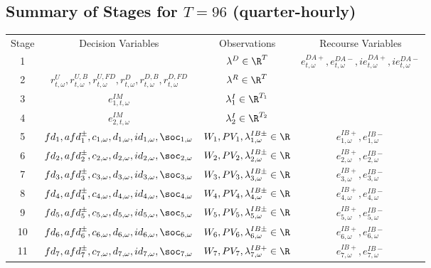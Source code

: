 \subsection{\texorpdfstring{Summary of Stages for $T = 96$ (quarter-hourly)}{Summary of Stages for T = 96 (quarter-hourly)}}

\begin{table}[H]
\begin{tabular}{c c c c}
	Stage & Decision Variables & Observations & Recourse Variables \\
	1 & & $\lambda^D \in \R^{T}$& $e^{DA+}_{t, \omega}, e^{DA-}_{t, \omega}, ie^{DA+}_{t, \omega}, ie^{DA-}_{t, \omega}$\\
	2 & $r^U_{t, \omega}, r^{U, B}_{t, \omega}, r^{U, FD}_{t, \omega}, r^{D}_{t, \omega}, r^{D, B}_{t, \omega}, r^{D, FD}_{t, \omega}$ & $\lambda^R \in \R^{T}$& \\
	3 & $e^{IM}_{1, t, \omega}$ & $\lambda^I_1 \in \R^{T_1}$&  \\
	4 & $e^{IM}_{2, t, \omega}$ & $\lambda^I_2 \in \R^{T_2}$&  \\
	5 & $fd_1, afd^{\pm}_1, c_{1, \omega}, d_{1, \omega}, id_{1, \omega}, \soc_{1, \omega}$ & $W_1, PV_1, \lambda^{IB\pm}_{1, \omega} \in \R$ & $e^{IB+}_{1, \omega}, e^{IB-}_{1, \omega}$\\
	6 & $fd_2, afd^{\pm}_2, c_{2, \omega}, d_{2, \omega}, id_{2, \omega}, \soc_{2, \omega}$ & $W_2, PV_2, \lambda^{IB\pm}_{2, \omega} \in \R$ & $e^{IB+}_{2, \omega}, e^{IB-}_{2, \omega}$\\
	7& $fd_3, afd^{\pm}_3, c_{3, \omega}, d_{3, \omega}, id_{3, \omega}, \soc_{3, \omega}$  & $W_3, PV_3, \lambda^{IB\pm}_{3, \omega} \in \R$ & $e^{IB+}_{3, \omega}, e^{IB-}_{3, \omega}$\\
	8& $fd_4, afd^{\pm}_4, c_{4, \omega}, d_{4, \omega}, id_{4, \omega}, \soc_{4, \omega}$ & $W_4, PV_4, \lambda^{IB\pm}_{4, \omega} \in \R$ & $e^{IB+}_{4, \omega}, e^{IB-}_{4, \omega}$\\
	9& $fd_5, afd^{\pm}_5, c_{5, \omega}, d_{5, \omega}, id_{5, \omega}, \soc_{5, \omega}$ & $W_5, PV_5, \lambda^{IB\pm}_{5, \omega} \in \R$ & $e^{IB+}_{5, \omega}, e^{IB-}_{5, \omega}$\\
	10& $fd_6, afd^{\pm}_6, c_{6, \omega}, d_{6, \omega}, id_{6, \omega}, \soc_{6, \omega}$ & $W_6, PV_6, \lambda^{IB\pm}_{6, \omega} \in \R$ & $e^{IB+}_{6, \omega}, e^{IB-}_{6, \omega}$\\
	11& $fd_7, afd^{\pm}_7, c_{7, \omega}, d_{7, \omega}, id_{7, \omega}, \soc_{7, \omega}$ & $W_7, PV_7, \lambda^{IB+}_{7, \omega} \in \R$ & $e^{IB+}_{7, \omega}, e^{IB-}_{7, \omega}$\\

\end{tabular}
\end{table}
